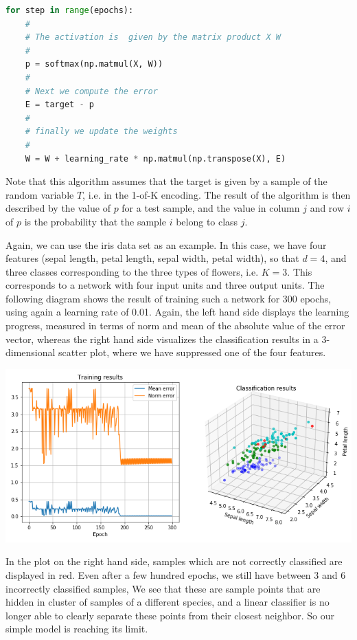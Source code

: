 \documentclass[a4paper, draft]{report}
\numberwithin{section}{chapter}
\numberwithin{equation}{chapter}
\theoremstyle{own}
\theoremstyle{remark}
\begin{document}
\begin{lstlisting}[frame=single,language=Python,caption=Implementation of the training phase in Python]
for step in range(epochs):
    # 
    # The activation is  given by the matrix product X W 
    #
    p = softmax(np.matmul(X, W))
    # 
    # Next we compute the error
    E = target - p
    #
    # finally we update the weights
    #
    W = W + learning_rate * np.matmul(np.transpose(X), E)
\end{lstlisting}

Note that this algorithm assumes that the target is given by a sample of the random variable $T$, i.e. in the 1-of-K encoding. The result of the algorithm is then described by the value of $p$ for a test sample, and the value in column $j$ and row $i$ of $p$ is the probability that the sample $i$ belong to class $j$.  

Again, we can use the iris data set as an example. In this case, we have four features (sepal length, petal length, sepal width, petal width), so that $d=4$, and three classes corresponding to the three types of flowers, i.e. $K=3$. This corresponds to a network with four input units and three output units. The following diagram shows the result of training such a network for 300 epochs, using again a learning rate of 0.01. Again, the left hand side displays the learning progress, measured in terms of norm and mean of the absolute value of the error vector, whereas the right hand side visualizes the classification results in a 3-dimensional scatter plot, where we have suppressed one of the four features.

\includegraphics[scale=0.47]{MultinomialRegressionIris.png}

In the plot on the right hand side, samples which are not correctly classified are displayed in red. Even after a few hundred epochs, we still have between 3 and 6 incorrectly classified samples, We see that these are sample points that are hidden in cluster of samples of a different species, and a linear classifier is no longer able to clearly separate these points from their closest neighbor. So our simple model is reaching its limit.
\end{document}
